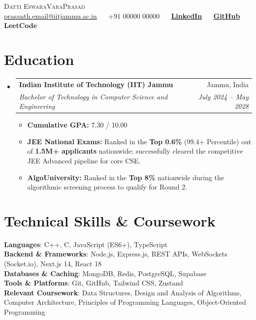 \documentclass[letterpaper,11pt]{article}
\makeatletter
\newcommand{\resumeSubheading}[4]{
  \vspace{-1pt}\item
    \begin{tabular*}{0.97\textwidth}[t]{l@{\extracolsep{\fill}}r}
      \textbf{#1} & #2 \\
      \textit{\small#3} & \textit{\small #4} \\
    \end{tabular*}\vspace{-6pt}
}
\newcommand{\resumeSubHeadingListStart}{\begin{itemize}[leftmargin=0.15in, label={}]}
\newcommand{\resumeSubHeadingListEnd}{\end{itemize}}
\makeatother
\begin{document}
\begin{center}
    {\Huge \scshape Datti EswaraVaraPrasad} \\ \vspace{6pt}
    \small 
    \href{mailto:prasanth.email@iitjammu.ac.in}{prasanth.email@iitjammu.ac.in} ~\textbar~ 
    +91 00000 00000 ~\textbar~ 
    \href{https://linkedin.com/in/yourprofile}{\textbf{LinkedIn}} ~\textbar~ 
    \href{https://github.com/yourusername}{\textbf{GitHub}} ~\textbar~
    \textbf{LeetCode}
\end{center}


\section*{Education}
  \resumeSubHeadingListStart
    \resumeSubheading
      {Indian Institute of Technology (IIT) Jammu}{Jammu, India}
      {Bachelor of Technology in Computer Science and Engineering}{July 2024 -- May 2028}
      \begin{itemize}[leftmargin=0.15in, label={$\bullet$}, itemsep=1pt, parseitemsep=1pt]
        \item \small{\textbf{Cumulative GPA:} 7.30 / 10.00}
        \item \small{\textbf{JEE National Exams:} Ranked in the \textbf{Top 0.6\%} (99.4+ Percentile) out of \textbf{1.5M+ applicants} nationwide; successfully cleared the competitive JEE Advanced pipeline for core CSE.}
        \item \small{\textbf{AlgoUniversity:} Ranked in the \textbf{Top 8\%} nationwide during the algorithmic screening process to qualify for Round 2.}
      \end{itemize}
  \resumeSubHeadingListEnd


\section*{Technical Skills \& Coursework}
 \begin{itemize}[leftmargin=0.15in, label={}]
    \small{\item{
     \textbf{Languages}{: C++, C, JavaScript (ES6+), TypeScript} \\
     \textbf{Backend \& Frameworks}{: Node.js, Express.js, REST APIs, WebSockets (Socket.io), Next.js 14, React 18} \\
     \textbf{Databases \& Caching}{: MongoDB, Redis, PostgreSQL, Supabase} \\
     \textbf{Tools \& Platforms}{: Git, GitHub, Tailwind CSS, Zustand} \\
     \textbf{Relevant Coursework}{: Data Structures, Design and Analysis of Algorithms, Computer Architecture, Principles of Programming Languages, Object-Oriented Programming}
    }}
 \end{itemize}
\end{document}
